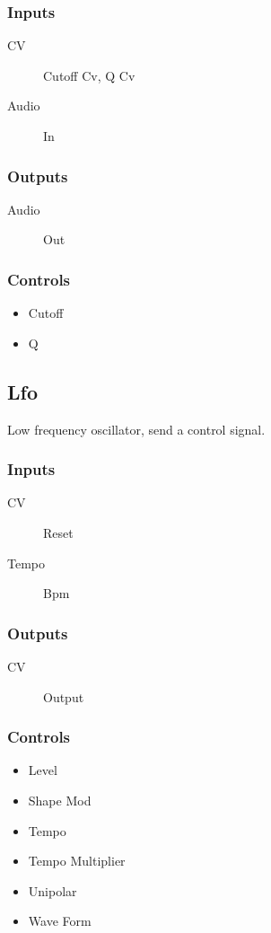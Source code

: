 \subsubsection{Inputs}
\begin{description}
\item [CV] Cutoff Cv, Q Cv
\item [Audio] In
\end{description}

\subsubsection{Outputs}
\begin{description}
\item [Audio] Out
\end{description}

\subsubsection{Controls}
\begin{itemize}
\item Cutoff
\item Q
\end{itemize}

\subsection{Lfo}

Low frequency oscillator, send a control signal.



\subsubsection{Inputs}
\begin{description}
\item [CV] Reset
\item [Tempo] Bpm
\end{description}

\subsubsection{Outputs}
\begin{description}
\item [CV] Output
\end{description}

\subsubsection{Controls}
\begin{itemize}
\item Level
\item Shape Mod
\item Tempo
\item Tempo Multiplier
\item Unipolar
\item Wave Form
\end{itemize}

